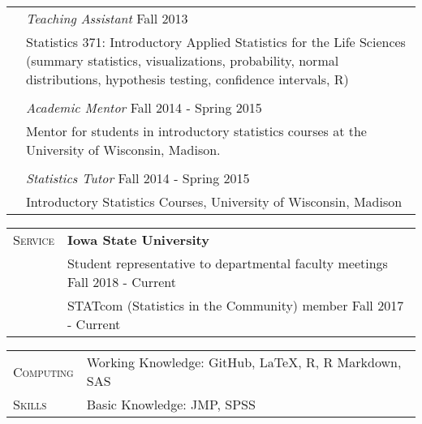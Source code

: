 \documentclass[11pt, oneside]{article}
\begin{document}
\begin{longtable}{p{3cm}p{14cm}}
\\
& \emph{Teaching Assistant} \hfill{Fall 2013}\\
& Statistics 371: Introductory Applied Statistics for the Life Sciences (summary statistics, visualizations, probability, normal distributions, hypothesis testing, confidence intervals, R)\\
\\
& \emph{Academic Mentor} \hfill{Fall 2014 - Spring 2015}\\
& Mentor for students in introductory statistics courses at the University of Wisconsin, Madison.\\
\\
& \emph{Statistics Tutor} \hfill{Fall 2014 - Spring 2015}\\
& Introductory Statistics Courses, University of Wisconsin, Madison
\end{longtable}

\vspace{0.5cm}

\noindent 
\begin{tabular}{p{3cm}p{14cm}}
\textsc{Service} & \textbf{Iowa State University} \\
& Student representative to departmental faculty meetings \hfill{Fall 2018 - Current}\\
& STATcom (Statistics in the Community) member \hfill{Fall 2017 - Current}\\
\end{tabular}


\vspace{0.5cm}

\noindent
\begin{tabular}{p{3cm}l}
\textsc{Computing} & Working Knowledge: GitHub, LaTeX, R, R Markdown, SAS\\
\textsc{Skills} & Basic Knowledge: JMP, SPSS
\end{tabular}
\end{document}

